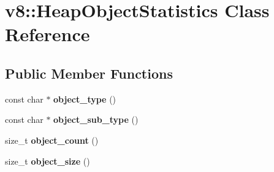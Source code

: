 \hypertarget{classv8_1_1_heap_object_statistics}{}\section{v8\+:\+:Heap\+Object\+Statistics Class Reference}
\label{classv8_1_1_heap_object_statistics}
\subsection*{Public Member Functions}
\begin{DoxyCompactItemize}
\item 
const char $\ast$ {\bfseries object\+\_\+type} ()\hypertarget{classv8_1_1_heap_object_statistics_a2e9a0e6c13c9db9ff2e7325dddb533b7}{}\label{classv8_1_1_heap_object_statistics_a2e9a0e6c13c9db9ff2e7325dddb533b7}

\item 
const char $\ast$ {\bfseries object\+\_\+sub\+\_\+type} ()\hypertarget{classv8_1_1_heap_object_statistics_a148312ee9ba0ed04bd0c51c0aeb54bc1}{}\label{classv8_1_1_heap_object_statistics_a148312ee9ba0ed04bd0c51c0aeb54bc1}

\item 
size\+\_\+t {\bfseries object\+\_\+count} ()\hypertarget{classv8_1_1_heap_object_statistics_a80ae1b0b1ba566bbb68c98aedb9948ab}{}\label{classv8_1_1_heap_object_statistics_a80ae1b0b1ba566bbb68c98aedb9948ab}

\item 
size\+\_\+t {\bfseries object\+\_\+size} ()\hypertarget{classv8_1_1_heap_object_statistics_a973a50d32c03260eda0699e58f9049ff}{}\label{classv8_1_1_heap_object_statistics_a973a50d32c03260eda0699e58f9049ff}

\end{DoxyCompactItemize}
